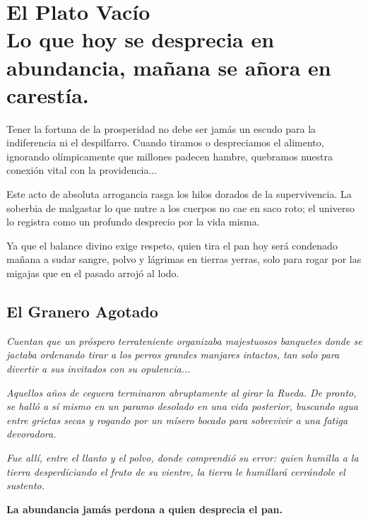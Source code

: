 \chapter[El Plato Vacío]{El Plato Vacío\\ \large Lo que hoy se desprecia en abundancia, mañana se añora en carestía.}


\lettrine[lines=3, nindent=0.5em, findent=0.2em]{T}{}ener la fortuna de la prosperidad no debe ser jamás un escudo para la indiferencia ni el despilfarro. Cuando tiramos o despreciamos el alimento, ignorando olímpicamente que millones padecen hambre, quebramos nuestra conexión vital con la providencia...

Este acto de absoluta arrogancia rasga los hilos dorados de la supervivencia. La soberbia de malgastar lo que nutre a los cuerpos no cae en saco roto; el universo lo registra como un profundo desprecio por la vida misma.

Ya que el balance divino exige respeto, quien tira el pan hoy será condenado mañana a sudar sangre, polvo y lágrimas en tierras yerras, solo para rogar por las migajas que en el pasado arrojó al lodo.

\section{El Granero Agotado}
\begin{elegantquote}
\textit{Cuentan que un próspero terrateniente organizaba majestuosos banquetes donde se jactaba ordenando tirar a los perros grandes manjares intactos, tan solo para divertir a sus invitados con su opulencia...}

\textit{Aquellos años de ceguera terminaron abruptamente al girar la Rueda. De pronto, se halló a sí mismo en un paramo desolado en una vida posterior, buscando agua entre grietas secas y rogando por un mísero bocado para sobrevivir a una fatiga devoradora.}

\textit{Fue allí, entre el llanto y el polvo, donde comprendió su error: quien humilla a la tierra desperdiciando el fruto de su vientre, la tierra le humillará cerrándole el sustento.}

\end{elegantquote}


\vspace{1em}
\begin{center}
    \textbf{\Large La abundancia jamás perdona a quien desprecia el pan.}
\end{center}
\vspace{1em}

